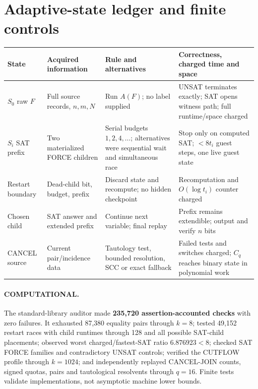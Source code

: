 \documentclass[11pt]{article}
\begin{document}
\section{Adaptive-state ledger and finite controls}
\begin{center}\small
\begin{tabular}{p{.15\linewidth}p{.25\linewidth}p{.23\linewidth}p{.22\linewidth}}\toprule
State & Acquired information & Rule and alternatives & Correctness, charged time and space\\\midrule
$S_0$ raw $F$ & Full source records, $n,m,N$ & Run $A(F)$; no label supplied & UNSAT terminates exactly; SAT opens witness path; full runtime/space charged\\
$S_i$ SAT prefix & Two materialized FORCE children & Serial budgets $1,2,4,\ldots$; alternatives were sequential wait and simultaneous race & Stop only on computed SAT; $<8t_i$ guest steps, one live guest state\\
Restart boundary & Dead-child bit, budget, prefix & Discard state and recompute; no hidden checkpoint & Recomputation and $O(\log t_i)$ counter charged\\
Chosen child & SAT answer and extended prefix & Continue next variable; final replay & Prefix remains extendible; output and verify $n$ bits\\
CANCEL source & Current pair/incidence data & Tautology test, bounded resolution, SCC or exact fallback & Failed tests and switches charged; $C_q$ reaches binary state in polynomial work\\\bottomrule
\end{tabular}
\end{center}

\paragraph{COMPUTATIONAL.}
The standard-library auditor made \textbf{235,720 assertion-accounted checks}
with zero failures.  It exhausted 87,380 equality pairs through $k=8$;
tested 49,152 restart races with child runtimes through 128 and all possible
SAT-child placements; observed worst charged/fastest-SAT ratio
$6.876923<8$; checked SAT FORCE families and contradictory UNSAT controls;
verified the CUTFLOW profile through $k=1024$; and independently replayed
CANCEL-JOIN counts, signed quotas, pairs and tautological resolvents through
$q=16$.  Finite tests validate implementations, not asymptotic machine lower
bounds.
\end{document}
